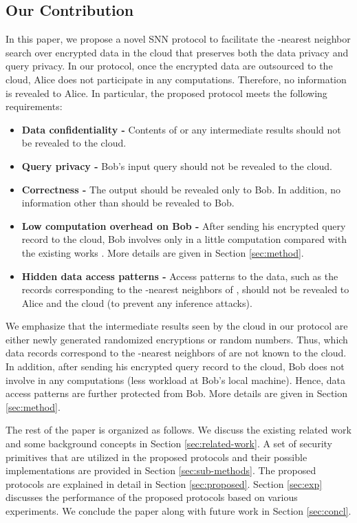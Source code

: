 \documentclass{article}
\begin{document}
\subsection{Our Contribution} 
In this paper, we propose a novel SNN protocol to facilitate the -nearest neighbor 
search over encrypted data in the cloud that preserves both the data privacy and query privacy. In our 
protocol, once the encrypted data are outsourced to the cloud, Alice does not participate in any 
computations. Therefore, no information is revealed to Alice. 
In particular, the proposed protocol meets the following requirements:
\begin{itemize}\itemsep=0pt
\item \textbf{Data confidentiality - } Contents of  or any intermediate results should not be revealed to the cloud. 
\item \textbf{Query privacy - } Bob's input query  should not be revealed to the cloud.
\item  \textbf{Correctness - } The output  
should be revealed only to Bob. In addition, no information other than  
should be revealed to Bob.
\item \textbf{Low computation overhead on Bob - } After sending his encrypted 
query record to the cloud, Bob involves only in a little computation 
compared with the existing works \cite{wong2009secure,hu2011processing,yaosecure}. More details are 
given in Section \ref{sec:method}.
\item \textbf{Hidden data access patterns - } Access patterns to the data, such as 
the records corresponding to the -nearest neighbors 
of , should 
not be revealed to Alice and the cloud (to prevent any inference attacks). 
\end{itemize}
We emphasize that the intermediate results seen by the cloud in our protocol 
are either newly generated randomized encryptions or 
random numbers. Thus, which data records 
correspond to the -nearest neighbors of  are 
not known to the cloud.  In addition, after sending his encrypted 
query record to the cloud, Bob does not involve in any computations (less workload at Bob's local machine). Hence, 
data access patterns are further protected from Bob. More details are given in Section \ref{sec:method}.

The rest of the paper is organized as follows. 
We discuss the existing related work and some background concepts    
in Section \ref{sec:related-work}. A set of security primitives that are utilized 
in the proposed protocols and their possible implementations are provided in Section \ref{sec:sub-methods}. 
The proposed protocols are explained in detail in 
Section \ref{sec:proposed}. Section \ref{sec:exp} discusses the performance 
of the proposed protocols based on various experiments. We conclude the paper along 
with future work in Section \ref{sec:concl}.
\end{document}
